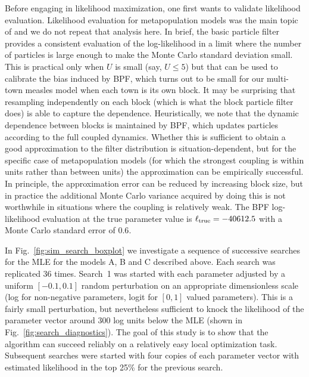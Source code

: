 \documentclass[12pt]{article}\usepackage[]{graphicx}\usepackage[]{xcolor}
\begin{document}
Before engaging in likelihood maximization, one first wants to validate likelihood evaluation.
Likelihood evaluation for metapopulation models was the main topic of \citet{ionides21} and we do not repeat that analysis here.
In brief, the basic particle filter provides a consistent evaluation of the log-likelihood in a limit where the number of particles is large enough to make the Monte Carlo standard deviation small.
This is practical only when $U$ is small (say, $U\le 5$) but that can be used to calibrate the bias induced by BPF, which turns out to be small for our multi-town measles model when each town is its own block.
It may be surprising that resampling independently on each block (which is what the block particle filter does) is able to capture the dependence.
Heuristically, we note that the dynamic dependence between blocks is maintained by BPF, which updates particles according to the full coupled dynamics.
Whether this is sufficient to obtain a good approximation to the filter distribution is situation-dependent, but for the specific case of metapopulation models (for which the strongest coupling is within units rather than between units) the approximation can be empirically successful.
In principle, the approximation error can be reduced by increasing block size, but in practice the additional Monte Carlo variance acquired by doing this is not worthwhile in situations where the coupling is relatively weak.
The BPF log-likelihood evaluation at the true parameter value is $\ell_{\mathrm{true}}=-40612.5$ with a Monte Carlo standard error of $0.6$.


In Fig.~\ref{fig:sim_search_boxplot} we investigate a sequence of successive searches for the MLE for the models A, B and C described above.
Each search was replicated $36$ times.
Search~1 was started with each parameter adjusted by a uniform $[-0.1,0.1]$ random perturbation on an appropriate dimensionless scale (log for non-negative parameters, logit for $[0,1]$ valued parameters).
This is a fairly small perturbation, but nevertheless sufficient to knock the likelihood of the parameter vector around 300 log units below the MLE (shown in Fig.~\ref{fig:search_diagnostics}).
The goal of this study is to show that the algorithm can succeed reliably on a relatively easy local optimization task.
Subsequent searches were started with four copies of each parameter vector with estimated likelihood in the top 25\% for the previous search.
\end{document}

